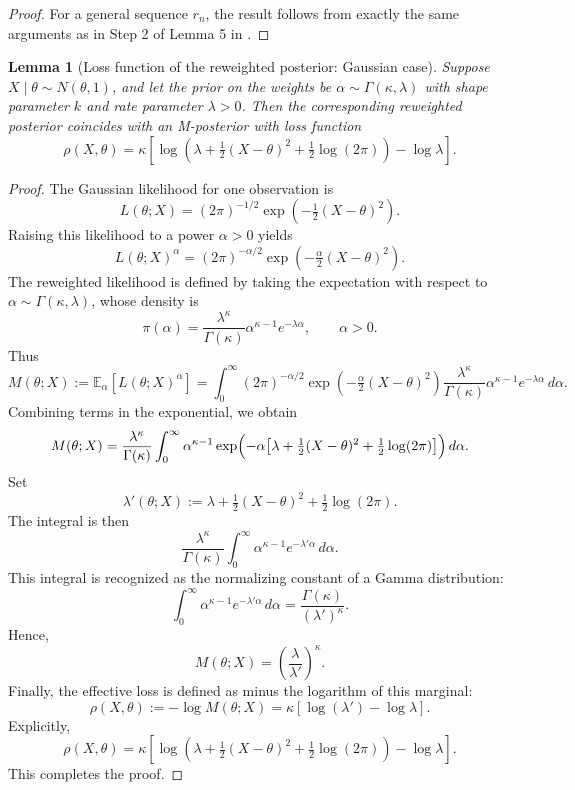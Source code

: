 \documentclass[11pt, oneside]{amsart}
\newtheorem{lemma}{Lemma}
\theoremstyle{definition}   %
\begin{document}
\begin{proof}
%
For a general sequence $r_n$, the result follows from exactly the same arguments as in Step 2 of Lemma 5 in \cite{avellamedinaetal2021}.
\end{proof}

\begin{lemma}[Loss function of the reweighted posterior: Gaussian case]
\label{lemma::calculation-reweighted-posterior-normal}
    Suppose \(X \mid \theta \sim N(\theta,1)\), and let the prior on the weights be \(\alpha \sim \Gamma(\kappa,\lambda)\) with shape parameter \(k\) and rate parameter \(\lambda>0\).
    Then the corresponding reweighted posterior coincides with an M-posterior with loss function
    \[
        \rho(X, \theta) 
        = \kappa\left[ \log \left(\lambda + \tfrac{1}{2}(X-\theta)^2 + \tfrac{1}{2}\log(2\pi)\right) - \log \lambda \right].
    \]
\end{lemma}
%
\begin{proof}
    The Gaussian likelihood for one observation is
    \[
        L(\theta;X) 
        = (2\pi)^{-1/2} \exp \left(-\tfrac{1}{2}(X-\theta)^2\right).
    \]
    Raising this likelihood to a power \(\alpha > 0\) yields
    \[
        L(\theta;X)^\alpha 
        = (2\pi)^{-\alpha/2} \exp \left(-\tfrac{\alpha}{2}(X-\theta)^2\right).
    \]
    The reweighted likelihood is defined by taking the expectation with respect to \(\alpha \sim \Gamma(\kappa,\lambda)\), whose density is
    \[
        \pi(\alpha) = \frac{\lambda^\kappa}{\Gamma(\kappa)} \alpha^{\kappa-1} e^{-\lambda \alpha}, 
        \qquad \alpha>0.
    \]
    Thus
    \[
        M(\theta;X) := \mathbb{E}_\alpha[L(\theta;X)^\alpha]
        = \int_0^\infty (2\pi)^{-\alpha/2} \exp\left(-\tfrac{\alpha}{2}(X-\theta)^2\right) \frac{\lambda^\kappa}{\Gamma(\kappa)} \alpha^{\kappa-1} e^{-\lambda \alpha}\, d\alpha.
    \]
    Combining terms in the exponential, we obtain
    \[
        M(\theta;X)
        = \frac{\lambda^\kappa}{\Gamma(\kappa)} \int_0^\infty \alpha^{\kappa-1} \exp \Bigl(-\alpha\bigl[\lambda + \tfrac{1}{2}(X-\theta)^2 + \tfrac{1}{2}\log(2\pi)\bigr]\Bigr)\, d\alpha.
    \]
    Set
    \[
        \lambda'(\theta;X) := \lambda + \tfrac{1}{2}(X-\theta)^2 + \tfrac{1}{2}\log(2\pi).
    \]
    The integral is then
    \[
        \frac{\lambda^\kappa}{\Gamma(\kappa)} \int_0^\infty \alpha^{\kappa-1} e^{-\lambda'\alpha}\, d\alpha.
    \]
    This integral is recognized as the normalizing constant of a Gamma distribution:
    \[
        \int_0^\infty \alpha^{\kappa-1} e^{-\lambda'\alpha}\, d\alpha = \frac{\Gamma(\kappa)}{(\lambda')^\kappa}.
    \]
    Hence,
    \[
        M(\theta;X) = \left(\frac{\lambda}{\lambda'}\right)^\kappa.
    \]
    Finally, the effective loss is defined as minus the logarithm of this marginal:
    \[
        \rho(X, \theta) := -\log M(\theta;X) = \kappa\left[\log(\lambda') - \log \lambda\right].
    \]
    Explicitly,
    \[
        \rho(X, \theta) = \kappa\left[ \log \left(\lambda + \tfrac{1}{2}(X-\theta)^2 + \tfrac{1}{2}\log(2\pi)\right) - \log \lambda \right].
    \]
    This completes the proof.
\end{proof}
\end{document}
